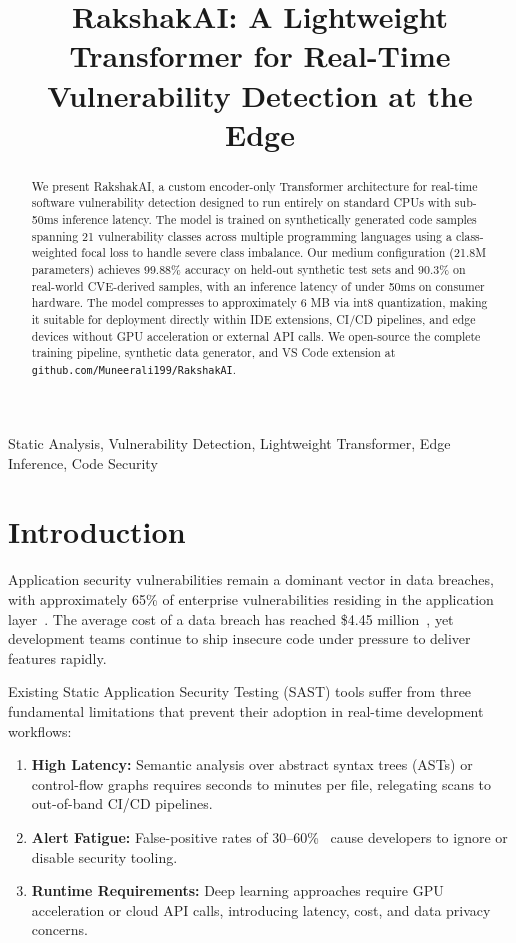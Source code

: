 \documentclass[conference,compsoc]{IEEEtran}
\title{RakshakAI: A Lightweight Transformer for Real-Time Vulnerability Detection at the Edge}
\author{
    \IEEEauthorblockN{Muneerali}
    \IEEEauthorblockA{\textit{RakshakAI Project}\\
    \texttt{github.com/Muneerali199/RakshakAI}}
}
\begin{document}
\maketitle

\begin{abstract}
We present RakshakAI, a custom encoder-only Transformer architecture for real-time software vulnerability detection designed to run entirely on standard CPUs with sub-50ms inference latency. The model is trained on synthetically generated code samples spanning 21 vulnerability classes across multiple programming languages using a class-weighted focal loss to handle severe class imbalance. Our medium configuration (21.8M parameters) achieves 99.88\% accuracy on held-out synthetic test sets and 90.3\% on real-world CVE-derived samples, with an inference latency of under 50ms on consumer hardware. The model compresses to approximately 6 MB via int8 quantization, making it suitable for deployment directly within IDE extensions, CI/CD pipelines, and edge devices without GPU acceleration or external API calls. We open-source the complete training pipeline, synthetic data generator, and VS Code extension at \texttt{github.com/Muneerali199/RakshakAI}.
\end{abstract}

\begin{IEEEkeywords}
Static Analysis, Vulnerability Detection, Lightweight Transformer, Edge Inference, Code Security
\end{IEEEkeywords}

\section{Introduction}
\label{sec:introduction}

Application security vulnerabilities remain a dominant vector in data breaches, with approximately 65\% of enterprise vulnerabilities residing in the application layer~\cite{verizondbir2024}. The average cost of a data breach has reached \$4.45 million~\cite{ibm2024}, yet development teams continue to ship insecure code under pressure to deliver features rapidly.

Existing Static Application Security Testing (SAST) tools suffer from three fundamental limitations that prevent their adoption in real-time development workflows:

\begin{enumerate}
    \item \textbf{High Latency:} Semantic analysis over abstract syntax trees (ASTs) or control-flow graphs requires seconds to minutes per file, relegating scans to out-of-band CI/CD pipelines.
    \item \textbf{Alert Fatigue:} False-positive rates of 30--60\%~\cite{snyk2023} cause developers to ignore or disable security tooling.
    \item \textbf{Runtime Requirements:} Deep learning approaches require GPU acceleration or cloud API calls, introducing latency, cost, and data privacy concerns.
\end{enumerate}
\end{document}
